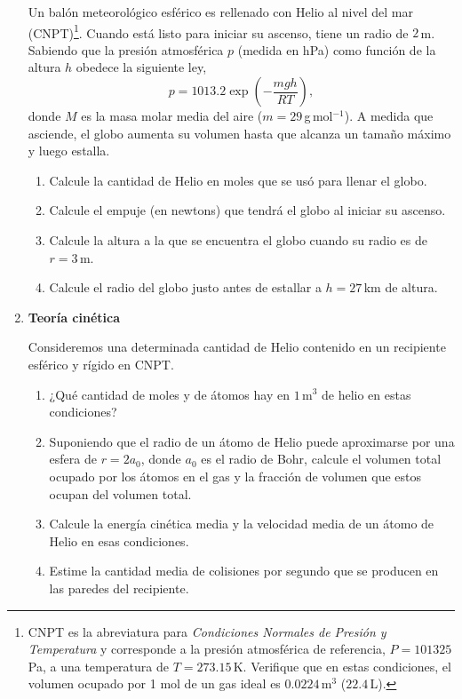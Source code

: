 \documentclass[a4paper,12pt]{article}
\begin{document}
\begin{enumerate}
		Un balón meteorológico esférico es rellenado con Helio al nivel del mar
		(CNPT)\footnote{CNPT es la abreviatura para {\textit{Condiciones
		Normales de Presión y Temperatura}} y corresponde a la presión
		atmosférica de referencia, $P=101325$\,Pa, a una temperatura de
		$T=273.15$\,K. Verifique que en estas condiciones, el volumen ocupado
		por 1 mol de un gas ideal es $0.0224$\,m$^3$ ($22.4$\,L).}.  Cuando
		está listo para iniciar su ascenso, tiene un radio de $2$\,m.  Sabiendo
		que la presión atmosférica $p$ (medida en hPa) como función de la
		altura $h$ obedece la siguiente ley, \[ p = 1013.2 \exp \left (
		-\frac{mgh}{RT} \right ),\] donde $M$ es la masa molar media del aire
		($m=29$\,g\,mol$^{-1}$). A medida que asciende, el globo aumenta su
		volumen hasta que alcanza un tamaño máximo y luego estalla. 
		\begin{enumerate}
			\item Calcule la cantidad de Helio en moles que se usó para llenar el globo.
			\item Calcule el empuje (en newtons) que tendrá el globo al iniciar su ascenso. 
			\item Calcule la altura a la que se encuentra el globo cuando su radio es de $r=3$\,m.
			\item Calcule el radio del globo justo antes de estallar a $h=27$\,km de altura.
		\end{enumerate}

	\item {\bf{Teoría cinética}}

		Consideremos una determinada cantidad de Helio contenido en un recipiente esférico y rígido en CNPT.
		\begin{enumerate}
			\item ¿Qué cantidad de moles y de átomos hay en $1$\,m$^3$ de
				helio en estas condiciones?
			\item Suponiendo que el radio de un átomo de Helio puede
				aproximarse por una esfera de $r=2 a_0$, donde $a_0$ es el
				radio de Bohr, calcule el volumen total ocupado por los átomos
				en el gas y la fracción de volumen que estos ocupan del volumen
				total. 
			\item Calcule la energía cinética media y la velocidad media de un átomo de Helio en esas condiciones. 
			\item Estime la cantidad media de colisiones por segundo que se producen en las paredes del recipiente. 
		\end{enumerate}
	

\end{enumerate}
\end{document}
